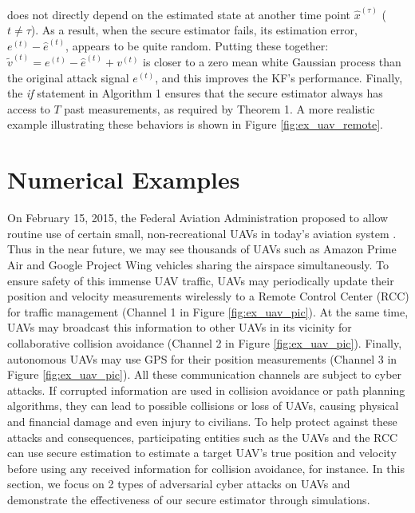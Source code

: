 \documentclass[twocolumn]{autart}    %
\newcommand{\rev}[1]{{\normalsize{{{\color{blue}#1}}}}}
\begin{document}
does not directly depend on the estimated state at another time point $\hat x^{(\tau)}$ ($t \neq \tau$). As a result, when the secure \rev{estimator} fails, its estimation error, $e^{(t)} - \hat e^{(t)}$, appears to be quite random. Putting these together: $\tilde v^{(t)} = e^{(t)} - \hat e^{(t)} + v^{(t)}$ is closer to a zero mean white Gaussian process than the original attack signal $e^{(t)}$, and this improves the KF's performance. 
Finally, the \textit{if} statement in Algorithm 1 ensures that the secure estimator always has access to $T$ past measurements, as required by Theorem 1.
A more realistic example illustrating these behaviors is shown in Figure \ref{fig:ex_uav_remote}.
\vspace{-0.6cm}
\section{Numerical Examples}\label{sec:examples}
\vspace{-0.4cm}
On February 15, 2015, the Federal Aviation Administration proposed to allow routine use of certain small, non-recreational UAVs in today's aviation system \cite{faa}. Thus in the near future, we may see thousands of UAVs such as Amazon Prime Air \cite{Amazon} and Google Project Wing vehicles \cite{Google} sharing the airspace simultaneously. To ensure safety of this immense UAV traffic, UAVs may periodically update their position and velocity measurements wirelessly to a Remote Control Center (RCC) for traffic management (Channel 1 in Figure \ref{fig:ex_uav_pic}). At the same time, UAVs may broadcast this information to other UAVs in its vicinity for collaborative collision avoidance (Channel 2 in Figure \ref{fig:ex_uav_pic}). Finally, autonomous UAVs may use GPS for their position measurements (Channel 3 in Figure \ref{fig:ex_uav_pic}). 
All these communication channels are subject to cyber attacks. 
If corrupted information are used in collision avoidance or path planning algorithms, they can lead to possible collisions or loss of UAVs, causing physical and financial damage and even injury to civilians.
To help protect against these attacks and consequences, participating entities such as the UAVs and the RCC can use secure estimation to estimate a target UAV's true position and velocity before using any received information for collision avoidance, for instance.
In this section, we focus on 2 types of adversarial cyber attacks on UAVs and demonstrate the effectiveness of our secure estimator through simulations.
\end{document}
